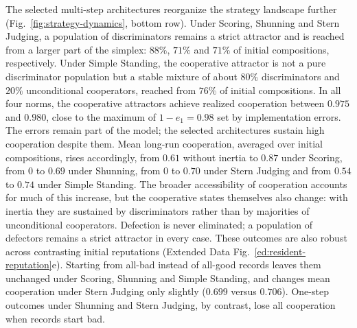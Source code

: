\documentclass[fleqn,10pt]{article}
\begin{document}
The selected multi-step architectures reorganize the strategy landscape further (Fig.~\ref{fig:strategy-dynamics}, bottom row). Under Scoring, Shunning and Stern Judging, a population of discriminators remains a strict attractor and is reached from a larger part of the simplex: $88\%$, $71\%$ and $71\%$ of initial compositions, respectively. Under Simple Standing, the cooperative attractor is not a pure discriminator population but a stable mixture of about $80\%$ discriminators and $20\%$ unconditional cooperators, reached from $76\%$ of initial compositions. In all four norms, the cooperative attractors achieve realized cooperation between $0.975$ and $0.980$, close to the maximum of $1-e_1=0.98$ set by implementation errors. The errors remain part of the model; the selected architectures sustain high cooperation despite them. Mean long-run cooperation, averaged over initial compositions, rises accordingly, from $0.61$ without inertia to $0.87$ under Scoring, from $0$ to $0.69$ under Shunning, from $0$ to $0.70$ under Stern Judging and from $0.54$ to $0.74$ under Simple Standing. The broader accessibility of cooperation accounts for much of this increase, but the cooperative states themselves also change: with inertia they are sustained by discriminators rather than by majorities of unconditional cooperators. Defection is never eliminated; a population of defectors remains a strict attractor in every case. These outcomes are also robust across contrasting initial reputations (Extended Data Fig.~\ref{ed:resident-reputation}e). Starting from all-bad instead of all-good records leaves them unchanged under Scoring, Shunning and Simple Standing, and changes mean cooperation under Stern Judging only slightly ($0.699$ versus $0.706$). One-step outcomes under Shunning and Stern Judging, by contrast, lose all cooperation when records start bad.
\end{document}
